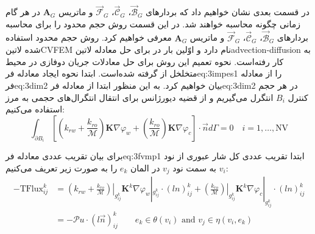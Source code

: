 در قسمت بعدی نشان خواهیم داد که بردار‌های 
$\vec{\mathcal B}_G$، $\vec{\mathcal C}_G$، $\vec{\mathcal F}_G$ و ماتریس $\textbf{A}_G$
در هر گام زمانی چگونه محاسبه خواهند شد.
\label{ch:35}
در این قسمت روش حجم محدود را برای محاسبه بردار‌های 
$\vec{\mathcal B}_G$، $\vec{\mathcal C}_G$، $\vec{\mathcal F}_G$ و ماتریس $\textbf{A}_G$
معرفی خواهیم کرد. روش حجم محدود استفاده شده ‌لاتین{CVFEM} نام دارد و اوّلین بار در  برای حل معادله ‌لاتین{advection-diffusion} به کار رفته‌است. نحوه تعمیم این روش برای حل معادلات جریان دوفازی در محیط متخلخل از   گرفته شده‌است. 
ابتدا نحوه ایجاد معادله ‌فر{eq:3impes1} را از معادله ‌فر{eq:3dim2} بیان خواهیم کرد. به این منظور ابتدا از معادله ‌فر{eq:3dim2} در هر حجم کنترل $B_i$ انتگرل می‌گیریم و از قضیه دیورژانس برای انتقال انتگرال‌های حجمی به مرز استفاده می‌کنیم:
\begin{equation}
\label{eq:3fvmp1}
\int_{\partial B_i} \left[ 
\left( k_{rw}+\frac{k_{ro}}{\mathcal{M}}\right) \textbf{K} \nabla \varphi_w + 
\left(\frac{k_{ro}}{\mathcal{M}}\right) \textbf{K} \nabla \varphi_c
\right] \cdot \vec{n} d\Gamma
= 0
\quad i=1,\ldots,\text{NV}
\end{equation}

برای بیان تقریب عددی معادله ‌فر{eq:3fvmp1} ابتدا تقریب عددی کل شار عبوری از نود $v_i$ به سمت نود $v_j$ در المان $e_k$ را به صورت زیر تعریف می‌کنیم:
\begin{equation}
\label{eq:3fvmp2}
\begin{aligned}
-\text{TFlux}_{ij}^k 
&=
\left.\left( k_{rw}+\frac{k_{ro}}{\mathcal{M}}\right)\right|_{g_{ij}^k} \textbf{K}^k \nabla \varphi_w|_{g_{ij}^k}
\cdot (ln)_{ij}^k +
\left.\left( \frac{k_{ro}}{\mathcal{M}}\right)\right|_{g_{ij}^k} \textbf{K}^k \nabla \varphi_c|_{g_{ij}^k} 
\cdot (ln)_{ij}^k \\
&= -\mathcal{P}u \cdot (l\vec{n})_{ij}^k
\qquad e_k \in \theta(v_i) \text{  and  } v_j \in \eta(v_i,e_k)
\end{aligned}
\end{equation}

